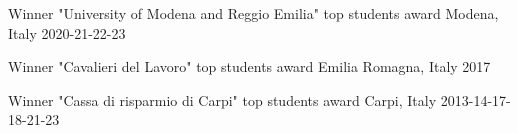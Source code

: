 






\begin{cvhonors}

  \cvhonor
    {Winner} %
    {"University of Modena and Reggio Emilia" top students award} %
    {Modena, Italy} %
    {2020-21-22-23} %

  \cvhonor
    {Winner} %
    {"Cavalieri del Lavoro" top students award } %
    {Emilia Romagna, Italy} %
    {2017} %

  \cvhonor
    {Winner} %
    {"Cassa di risparmio di Carpi" top students award} %
    {Carpi, Italy} %
    {2013-14-17-18-21-23} %

\end{cvhonors}
